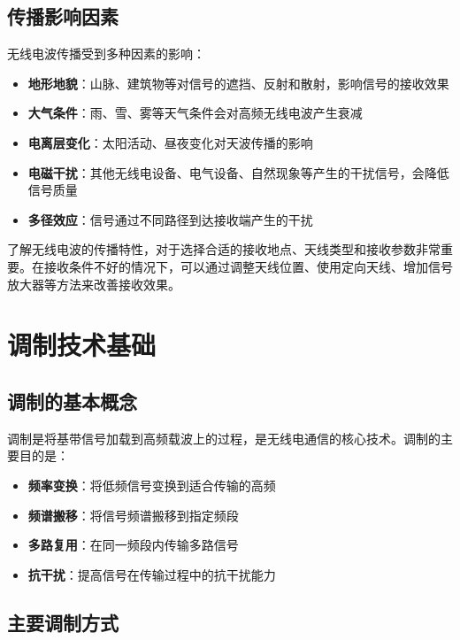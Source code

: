 \documentclass[12pt,UTF8]{ctexbook}
\begin{document}
\section{传播影响因素}

无线电波传播受到多种因素的影响：

\begin{itemize}[leftmargin=3.5em]
    \item \textbf{地形地貌}：山脉、建筑物等对信号的遮挡、反射和散射，影响信号的接收效果
    \item \textbf{大气条件}：雨、雪、雾等天气条件会对高频无线电波产生衰减
    \item \textbf{电离层变化}：太阳活动、昼夜变化对天波传播的影响
    \item \textbf{电磁干扰}：其他无线电设备、电气设备、自然现象等产生的干扰信号，会降低信号质量
    \item \textbf{多径效应}：信号通过不同路径到达接收端产生的干扰
\end{itemize}

了解无线电波的传播特性，对于选择合适的接收地点、天线类型和接收参数非常重要。在接收条件不好的情况下，可以通过调整天线位置、使用定向天线、增加信号放大器等方法来改善接收效果。

\chapter{调制技术基础}

\section{调制的基本概念}

调制是将基带信号加载到高频载波上的过程，是无线电通信的核心技术。调制的主要目的是：

\begin{itemize}[leftmargin=3.5em]
    \item \textbf{频率变换}：将低频信号变换到适合传输的高频
    \item \textbf{频谱搬移}：将信号频谱搬移到指定频段
    \item \textbf{多路复用}：在同一频段内传输多路信号
    \item \textbf{抗干扰}：提高信号在传输过程中的抗干扰能力
\end{itemize}

\section{主要调制方式}
\end{document}
